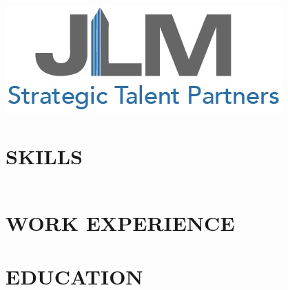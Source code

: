 \documentclass[12pt]{article}
\begin{document}
\includegraphics[scale=0.5]{images/JLM_Logo.png}

\begin{center}


\end{center}

\section{SKILLS}
    \begin{center}
    \begin{tabu} to \textwidth { X[c] X[c] }



    \end{tabu}
    \end{center}

\section{WORK EXPERIENCE}




\section{EDUCATION}
\end{document}
